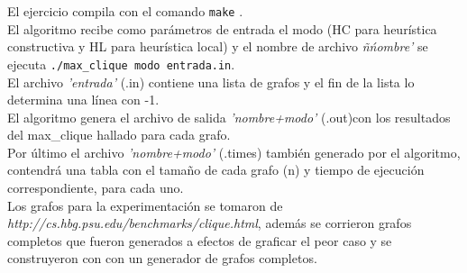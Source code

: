 El ejercicio compila con el comando \texttt{make} .\\
El algoritmo recibe como parámetros de entrada el modo (HC para heurística constructiva y HL para heurística local) y el nombre de archivo \emph{ñ\'nombre'} se ejecuta \texttt{./max\_clique modo entrada.in}.\\
El archivo \emph{'entrada'} (.in) contiene una lista de grafos y el fin de la lista lo determina una línea con -1.\\
El algoritmo genera el archivo de salida \emph{'nombre+modo'} (.out)con los resultados del max\_clique hallado para cada grafo.\\
Por último el archivo \emph{'nombre+modo'} (.times)  también generado por el algoritmo, contendrá una tabla con el tamaño de cada grafo (n) y tiempo de ejecución correspondiente, para cada uno.\\
Los grafos para la experimentación se tomaron de \emph{http://cs.hbg.psu.edu/benchmarks/clique.html}, además se corrieron grafos completos que fueron generados a efectos de graficar el peor caso y se construyeron con con un generador de grafos completos.